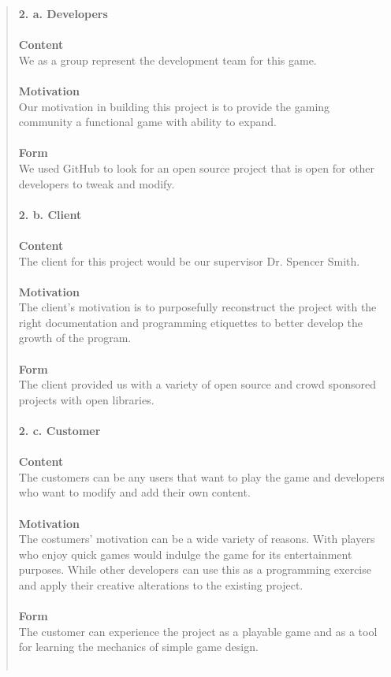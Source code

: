 \documentclass[12pt]{article}
\begin{document}
\begin{quote}
 \textbf{2. a. Developers}\\\\
 \textbf{Content}\\
 We as a group represent the development team for this game.\\\\
 \textbf{Motivation}\\
 Our motivation in building this project is to provide the gaming community a functional game with ability to expand.\\\\
 \textbf{Form}\\
 We used GitHub to look for an open source project that is open for other developers to tweak and modify.\\\\
 \textbf{2. b. Client}\\\\
 \textbf{Content}\\
 The client for this project would be our supervisor Dr. Spencer Smith.\\\\
 \textbf{Motivation}\\
 The client’s motivation is to purposefully reconstruct the project with the right documentation and programming etiquettes to better develop the growth of the program.\\\\
 \textbf{Form}\\
 The client provided us with a variety of open source and crowd sponsored projects with open libraries.\\\\
 \textbf{2. c. Customer}\\\\
 \textbf{Content}\\
 The customers can be any users that want to play the game and developers who want to modify and add their own content.\\\\
 \textbf{Motivation}\\
 The costumers’ motivation can be a wide variety of reasons. With players who enjoy quick games would indulge the game for its entertainment purposes. While other developers can use this as a programming exercise and apply their creative alterations to the existing project.\\\\
 \textbf{Form}\\
 The customer can experience the project as a playable game and as a tool for learning the mechanics of simple game design.\\\\

\end{quote}
\end{document}
